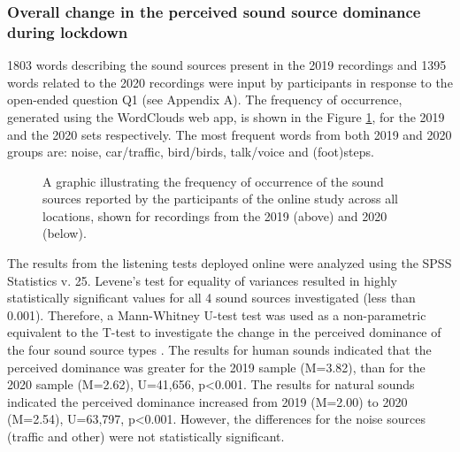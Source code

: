 \subsubsection{Overall change in the perceived sound source dominance during lockdown}

1803 words describing the sound sources present in the 2019 recordings and 1395 words related to the 2020 recordings were input by participants in response to the open-ended question Q1 (see Appendix A). The frequency of occurrence, generated using the WordClouds web app, is shown in the Figure \ref{fig:wordclo}, for the 2019 and the 2020 sets respectively. The most frequent words from both 2019 and 2020 groups are: noise, car/traffic, bird/birds, talk/voice and (foot)steps.

\begin{figure}
    \centering
    \caption{A graphic illustrating the frequency of occurrence of the sound sources reported by the participants of the online study across all locations, shown for recordings from the 2019 (above) and 2020 (below).}
    \label{fig:wordclo}
\end{figure}

The results from the listening tests deployed online were analyzed using the SPSS Statistics v. 25. Levene’s test for equality of variances resulted in highly statistically significant values for all 4 sound sources investigated (less than 0.001). Therefore, a Mann-Whitney U-test test was used as a non-parametric equivalent to the T-test to investigate the change in the perceived dominance of the four sound source types \citep{weiner_mann-whitney_2010}. The results for human sounds indicated that the perceived dominance was greater for the 2019 sample (M=3.82), than for the 2020 sample (M=2.62), U=41,656, p\textless{0.001}. The results for natural sounds indicated the perceived dominance increased from 2019 (M=2.00) to 2020 (M=2.54), U=63,797, p\textless{0.001}. However, the differences for the noise sources (traffic and other) were not statistically significant.

